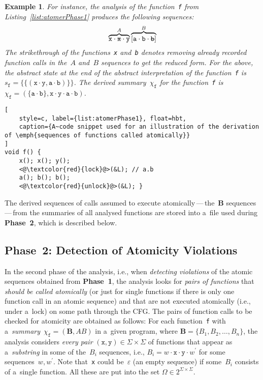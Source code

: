 \documentclass{ExcelAtFIT}
\theoremstyle{example}
\newtheorem{example}{Example}[section]
\def\uv#1{\iflanguage{british}{``#1''}{\quotedblbase #1\textquotedblleft}}
\begin{document}
\begin{example}
    For instance, the analysis of the function~\texttt{f} from Listing~\ref{list:atomerPhase1} produces the following sequences:
    $$
        \overbrace{\mathtt{x} \cdot \text{\texttt{\sout{x}}} \cdot \mathtt{y}}^A \overbrace{[\mathtt{a} \cdot \mathtt{b} \cdot \text{\texttt{\sout{b}}}]}^B
    $$
    The strikethrough of the functions~\texttt{x} and~\texttt{b} denotes removing already recorded function calls in the~$ A $ and~$ B $ sequences to get the reduced form. For the above, the abstract state at the end of the abstract interpretation of the function~\texttt{f} is $ s_\mathtt{f} = \{\{(\mathtt{x} \cdot \mathtt{y}, \mathtt{a} \cdot \mathtt{b})\}\} $. The derived summary~$ \chi_\mathtt{f} $ for the function~\texttt{f} is $ \chi_\mathtt{f} = {(\{{\mathtt{a} \cdot \mathtt{b}}\}, {\mathtt{x} \cdot \mathtt{y} \cdot \mathtt{a} \cdot \mathtt{b}})} $.
\end{example}

\begin{lstlisting}[
    style=c, label={list:atomerPhase1}, float=hbt,
    caption={A~code snippet used for an illustration of the derivation of \emph{sequences of functions called atomically}}
]
void f() {
    x(); x(); y();
    <@\textcolor{red}{lock}@>(&L); // a.b
    a(); b(); b();
    <@\textcolor{red}{unlock}@>(&L); }
\end{lstlisting}

The derived sequences of calls assumed to execute atomically\,---\,the~$ \boldsymbol{B} $ sequences\,---\,from the summaries of all analysed functions are stored into a~file used during \textbf{Phase~2}, which is described below.

\subsection{\hspace{-.35em}Phase~2: Detection of Atomicity Violations}

In the second phase of the analysis, i.e., when \emph{detecting violations} of the atomic sequences obtained from \textbf{Phase~1}, the analysis looks for \emph{pairs of functions} that \emph{should be called atomically} (or just for single functions if there is only one function call in an atomic sequence) and that are not executed atomically (i.e., under a~lock) on some path through the CFG. The pairs of function calls to be checked for atomicity are obtained as follows: For each function~\texttt{f} with a~\emph{summary}~$ \chi_\mathtt{f} = {(\boldsymbol{B}, AB)} $ in a~given program, where $ \boldsymbol{B} = {\{B_1, B_2, \ldots, B_n\}} $, the analysis considers \emph{every pair} $ {(\mathtt{x}, \mathtt{y})} \in \Sigma \times \Sigma $ of functions that appear as a~\emph{substring} in some of the~$ B_i $ sequences, i.e., $ B_i = w \cdot \mathtt{x} \cdot \mathtt{y} \cdot w^\prime $ for some sequences~$ w, w^\prime $. Note that~\texttt{x} could be~$ \varepsilon $ (an empty sequence) if some~$ B_i $ consists of a~single function. All these \uv{atomic pairs} are put into the set $ \Omega \in 2^{\Sigma \times \Sigma} $.
\end{document}
